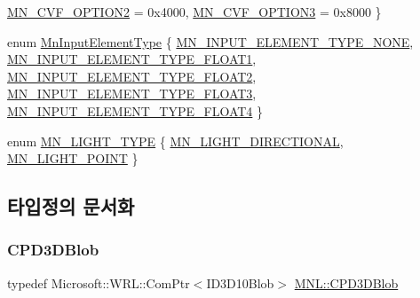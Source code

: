 \begin{DoxyCompactItemize}
\hyperlink{namespace_m_n_l_a37da403537a061d6aaa45b7d30f29ac2a49bf921871a33b21f3526c9a1a2c9671}{M\+N\+\_\+\+C\+V\+F\+\_\+\+O\+P\+T\+I\+O\+N2} = 0x4000, 
\newline
\hyperlink{namespace_m_n_l_a37da403537a061d6aaa45b7d30f29ac2a4b61871b94be7afa3cf4545778fe2234}{M\+N\+\_\+\+C\+V\+F\+\_\+\+O\+P\+T\+I\+O\+N3} = 0x8000
 \}
\item 
enum \hyperlink{namespace_m_n_l_a8605571a36b2bb477280767d71fe6f9e}{Mn\+Input\+Element\+Type} \{ \newline
\hyperlink{namespace_m_n_l_a8605571a36b2bb477280767d71fe6f9ea16f702c06e35b85077e39ce81b4e8004}{M\+N\+\_\+\+I\+N\+P\+U\+T\+\_\+\+E\+L\+E\+M\+E\+N\+T\+\_\+\+T\+Y\+P\+E\+\_\+\+N\+O\+NE}, 
\hyperlink{namespace_m_n_l_a8605571a36b2bb477280767d71fe6f9ea79ff25ed13ed363ab51080a5e49a3ce1}{M\+N\+\_\+\+I\+N\+P\+U\+T\+\_\+\+E\+L\+E\+M\+E\+N\+T\+\_\+\+T\+Y\+P\+E\+\_\+\+F\+L\+O\+A\+T1}, 
\hyperlink{namespace_m_n_l_a8605571a36b2bb477280767d71fe6f9ea306c60bed97bba07f77ff5b4766c02cb}{M\+N\+\_\+\+I\+N\+P\+U\+T\+\_\+\+E\+L\+E\+M\+E\+N\+T\+\_\+\+T\+Y\+P\+E\+\_\+\+F\+L\+O\+A\+T2}, 
\hyperlink{namespace_m_n_l_a8605571a36b2bb477280767d71fe6f9ea4d78a38c56b95c6855212c178f97d621}{M\+N\+\_\+\+I\+N\+P\+U\+T\+\_\+\+E\+L\+E\+M\+E\+N\+T\+\_\+\+T\+Y\+P\+E\+\_\+\+F\+L\+O\+A\+T3}, 
\newline
\hyperlink{namespace_m_n_l_a8605571a36b2bb477280767d71fe6f9ea37046f207cd7ff368225528152c2b760}{M\+N\+\_\+\+I\+N\+P\+U\+T\+\_\+\+E\+L\+E\+M\+E\+N\+T\+\_\+\+T\+Y\+P\+E\+\_\+\+F\+L\+O\+A\+T4}
 \}
\item 
enum \hyperlink{namespace_m_n_l_aac0b78de8bb8c872cb617ede813c113d}{M\+N\+\_\+\+L\+I\+G\+H\+T\+\_\+\+T\+Y\+PE} \{ \hyperlink{namespace_m_n_l_aac0b78de8bb8c872cb617ede813c113daae2f70c21587a6e8c7fc71a6c799975f}{M\+N\+\_\+\+L\+I\+G\+H\+T\+\_\+\+D\+I\+R\+E\+C\+T\+I\+O\+N\+AL}, 
\hyperlink{namespace_m_n_l_aac0b78de8bb8c872cb617ede813c113da7f51745230321843b3fe800eb08b3967}{M\+N\+\_\+\+L\+I\+G\+H\+T\+\_\+\+P\+O\+I\+NT}
 \}
\end{DoxyCompactItemize}


\subsection{타입정의 문서화}
\mbox{\label{namespace_m_n_l_a3716e3bee60c31fe1b7b5dd5a82db59a}} 
\subsubsection{\texorpdfstring{C\+P\+D3\+D\+Blob}{CPD3DBlob}}
{\footnotesize\ttfamily typedef Microsoft\+::\+W\+R\+L\+::\+Com\+Ptr$<$I\+D3\+D10\+Blob$>$ \hyperlink{namespace_m_n_l_a3716e3bee60c31fe1b7b5dd5a82db59a}{M\+N\+L\+::\+C\+P\+D3\+D\+Blob}}




